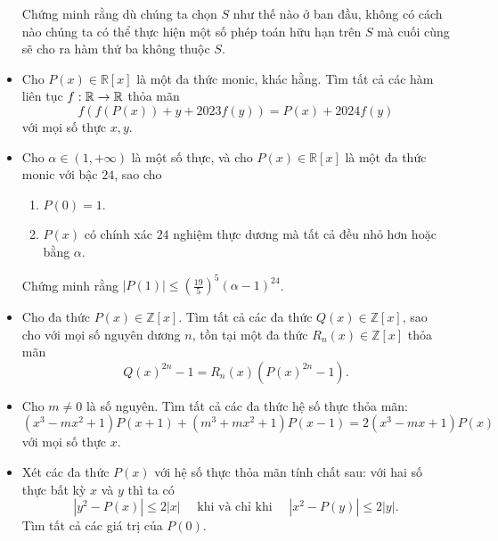 \documentclass[11pt]{scrartcl}
\begin{document}
\begin{itemize}[label=, leftmargin=0em, itemsep=-0em]
\begin{btvn}
            Chứng minh rằng dù chúng ta chọn $S$ như thế nào ở ban đầu, không có cách nào chúng ta có thể thực hiện một số phép toán hữu hạn trên $S$ mà cuối cùng sẽ cho ra hàm thứ ba không thuộc $S$.
        \end{btvn}
        \item \begin{btvn}
            Cho $P(x) \in \mathbb{R}[x]$ là một đa thức monic, khác hằng. Tìm tất cả các hàm liên tục $f: \mathbb{R} \to \mathbb{R}$ thỏa mãn
            $$f(f(P(x))+y+2023f(y))=P(x)+2024f(y)$$
            với mọi số thực $x,y$.
        \end{btvn}
        \item \begin{btvn}
            Cho $\alpha \in (1, +\infty)$ là một số thực, và cho $P(x) \in \mathbb{R}[x]$ là một đa thức monic với bậc $24$, sao cho
            \begin{enumerate}
                \item $P(0) = 1$.
                \item $P(x)$ có chính xác $24$ nghiệm thực dương mà tất cả đều nhỏ hơn hoặc bằng $\alpha$.
            \end{enumerate}
            Chứng minh rằng $|P(1)| \le \left( \frac{19}{5}\right)^5 (\alpha-1)^{24}$.
        \end{btvn}
        \item \begin{btvn}
           Cho đa thức $P(x) \in \mathbb{Z}[x]$. Tìm tất cả các đa thức $Q(x) \in \mathbb{Z}[x]$, sao cho với mọi số nguyên dương $n$, tồn tại một đa thức $R_n(x) \in \mathbb{Z}[x]$ thỏa mãn
            $$Q(x)^{2n} - 1 = R_n(x)\left(P(x)^{2n} - 1\right).$$
        \end{btvn}
        \item \begin{btvn} Cho $m \neq 0$ là số nguyên. Tìm tất cả các đa thức hệ số thực thỏa mãn:
        \[
            (x^3 - mx^2 + 1)P(x + 1) + (m^3 + mx^2 + 1)P(x - 1) = 2(x^3 - mx + 1)P(x)
        \]
        với mọi số thực $x$.
        \end{btvn}
        \item \begin{btvn} Xét các đa thức $P(x)$ với hệ số thực thỏa mãn tính chất sau: với hai số thực bất kỳ $x$ và $y$ thì ta có \[|y^2-P(x)|\le 2|x|\quad\text{ khi và chỉ khi }\quad |x^2-P(y)|\le 2|y|.\]Tìm tất cả các giá trị của $P(0)$.

\end{btvn}
\end{itemize}
\end{document}
